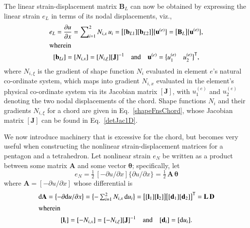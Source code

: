 The linear strain-displacement matrix $\mathbf{B}_L$ can now be obtained by expressing the linear strain $e_L$ in terms of its nodal displacements, viz.,
\begin{subequations}
    \begin{gather}
    e_L  = \frac{\partial u}{\partial x}  =
    \sum\nolimits_{i=1}^2 N_{i,x} \, u_i = 
    \bigl[ 
    [\mathbf{b}_{L1}] [\mathbf{b}_{L2}]
    \bigr] \bigl\{ \begin{matrix} 
    \mathbf{u}^{(e)} 
    \end{matrix} \bigr\} 
    = \bigl[ \mathbf{B}_L \bigr] \bigl\{ \mathbf{u}^{(e)} \bigr\} , \\
    \intertext{wherein} 
    [ \mathbf{b}_{Li} ] = [ N_{i,x} ] = [ N_{i,\xi} ] [ \mathbf{J} ]^{-1}
    \quad \text{and} \quad
    \mathbf{u}^{(e)}  = 
    \bigl\{ \begin{matrix}
    u^{(e)}_1 & u^{(e)}_2
    \end{matrix} \bigr\}^{\mathsf{T}} ,
    \end{gather}
\end{subequations}
where $N_{i,\xi}$ is the gradient of shape function $N_i$ evaluated in element $e$'s natural co-ordinate system, which maps into gradient $N_{i,x}$ evaluated in the element's physical co-ordinate system via its Jacobian matrix $[ \mathbf{J} ]$, with $u^{(e)}_1$ and $u^{(e)}_2$ denoting the two nodal displacements of the chord.  Shape functions $N_i$ and their gradients $N_{i,\xi}$ for a chord are given in Eq.~\ref{shapeFnsChord}, whose Jacobian matrix $[ \mathbf{J} ]$ can be found in Eq.~\ref{detJac1D}.

We now introduce machinery that is excessive for the chord, but becomes very useful when constructing the nonlinear strain-displacement matrices for a pentagon and a tetrahedron.  Let nonlinear strain $e_N$ be written as a product between some matrix $\mathbf{A}$ and some vector $\boldsymbol{\theta}$; specifically, let
\begin{equation}
e_ N =  \tfrac{1}{2} \,
[-\partial u / \partial x ]
\{\partial u / \partial x\}
= \tfrac{1}{2} \, \mathbf{A} \, \boldsymbol{\theta} 
\end{equation}
where $\mathbf{A} = [ -\partial u / \partial x ]$ whose differential is
\begin{subequations}
	\begin{gather}
	\mathrm{d} \mathbf{A} =  \bigl\{-
	\partial  \mathrm{d} u / \partial x
	\bigr\}
	= \bigl\{ \begin{matrix}
	- \sum\nolimits_{i=1}^2 N_{i,x} \,  \mathrm{d} u_i
	\end{matrix} \bigr\}
	= \bigl[ [\mathbf{l}_1] [\mathbf{l}_2] \bigr] \bigl[ [\mathbf{d}_1] [\mathbf{d}_2] \bigr]^{\mathsf{T}}
	= \mathbf{L} \, \mathbf{D}  \\
	\intertext{wherein}
	[\mathbf{l}_i] = [-N_{i,x}] = [-N_{i,\xi}] [ \mathbf{J}]^{-1} \quad \text{and} \quad  [\mathbf{d}_i] = [\mathrm{d} u_i] .
	\end{gather}
\end{subequations}

